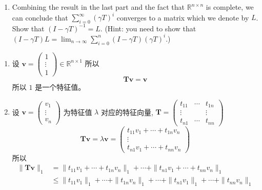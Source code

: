 \documentclass[11pt,letter,notitlepage]{article}
\begin{document}
\begin{exercise}
\begin{enumerate}
\begin{enumerate}
			      \item Combining the result in the last part and the fact that $\mathbb{R}^{n\times n}$ is complete, we can conclude that $\sum_{i=0}^\infty(\gamma T)^i$ converges to a matrix which we denote by $L$. Show that $(I-\gamma T)^{-1}=L$. (Hint: you need to show that $(I-\gamma T)L=\lim_{n\rightarrow\infty}\sum_{i=0}^{n}(I-\gamma T)(\gamma T)^i$.)
		      \end{enumerate}
	\end{enumerate}
\end{exercise}

\begin{solution}
	\begin{enumerate}
		\item 设 $\mathbf{v}=\begin{pmatrix}
				      1 \\ \vdots \\1
			      \end{pmatrix} \in \mathbb{R}^{n\times 1}$
		      所以 $$\mathbf{T}\mathbf{v}=\mathbf{v}$$
		      所以 $1$ 是一个特征值。
		\item 设 $\mathbf{v}=\begin{pmatrix}
				      v_1 \\ \vdots \\ v_n
			      \end{pmatrix}$ 为特征值 $\lambda$ 对应的特征向量, $\mathbf{T}=\begin{pmatrix}
				      t_{11} & \cdots & t_{1n} \\
				      \vdots &        & \vdots \\
				      t_{n1} & \cdots & t_{nn}
			      \end{pmatrix}$
		      $$\mathbf{T}\mathbf{v}=\lambda \mathbf{v} = \begin{pmatrix}
				      t_{11}v_1+\cdots+t_{1n}v_n \\ \vdots \\ t_{n1}v_1+\cdots+t_{nn}v_n
			      \end{pmatrix}$$
		      所以
		      $$\begin{aligned}
				      \|\mathbf{T}\mathbf{v}\|_1
				       & = \|t_{11}v_1+\cdots+t_{1n}v_n\|_1 + \cdots +\|t_{n1}v_1+\cdots+t_{nn}v_n\|_1                \\
				       & \leq \|t_{11}v_1\|_1+\cdots+\|t_{1n}v_n\|_1 + \cdots +\|t_{n1}v_1\|_1+\cdots+\|t_{nn}v_n\|_1 \\

\end{aligned}$$
\end{enumerate}
\end{solution}
\end{document}
